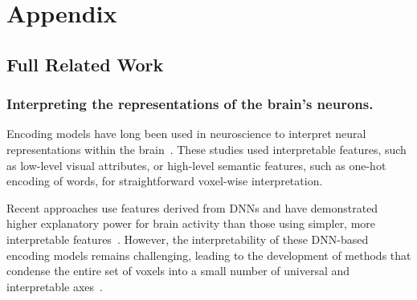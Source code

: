 \renewcommand\thefigure{A\arabic{figure}}
\renewcommand{\theHfigure}{A\arabic{figure}}

\setcounter{figure}{0}
\renewcommand\thetable{A\arabic{table}}
\renewcommand{\theHtable}{A\arabic{table}}
\setcounter{table}{0}
\renewcommand\theequation{A\arabic{equation}}
\renewcommand{\theHequation}{A\arabic{equation}}

\setcounter{equation}{0}

\appendix
\clearpage
\onecolumn


\section{Appendix}

\subsection{Full Related Work}
\label{appendix: related_work_1}
\subsubsection{Interpreting the representations of the brain's neurons.}
Encoding models have long been used in neuroscience to interpret neural representations within the brain~\cite{kay2008identifying, nishimoto2011reconstructing, naselaris2011encoding, huth2012continuous}. These studies used interpretable features, such as low-level visual attributes, or high-level semantic features, such as one-hot encoding of words, for straightforward voxel-wise interpretation.

Recent approaches use features derived from DNNs and have demonstrated higher explanatory power for brain activity than those using simpler, more interpretable features~\cite{gucclu2015deep, schrimpf2021neural, takagi2023high, antonello2024scaling}.  However, the interpretability of these DNN-based encoding models remains challenging, leading to the development of methods that condense the entire set of voxels into a small number of universal and interpretable axes~\cite{huth2016natural, lescroart2019human, nakagi2024unveiling}.

